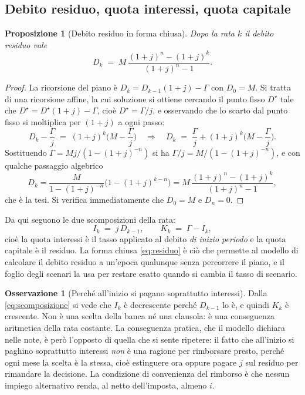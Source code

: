 \documentclass[11pt,a4paper]{article}
\theoremstyle{definition}
\newtheorem{osservazione}[definizione]{Osservazione}
\theoremstyle{plain}
\newtheorem{proposizione}[definizione]{Proposizione}
\begin{document}
\subsection{Debito residuo, quota interessi, quota capitale}

\begin{proposizione}[Debito residuo in forma chiusa]
Dopo la rata $k$ il debito residuo vale
\begin{equation}
D_k \;=\; M\,\frac{(1+j)^n - (1+j)^k}{(1+j)^n - 1} .
\label{eq:residuo}
\end{equation}
\end{proposizione}

\begin{proof}
La ricorsione del piano è $D_k = D_{k-1}(1+j) - \Gamma$ con $D_0 = M$. Si tratta di una ricorsione affine, la cui soluzione si ottiene cercando il punto fisso $D^\star$ tale che $D^\star = D^\star(1+j)-\Gamma$, cioè $D^\star = \Gamma/j$, e osservando che lo scarto dal punto fisso si moltiplica per $(1+j)$ a ogni passo:
\[
D_k - \frac{\Gamma}{j} \;=\; (1+j)^k\Big(M - \frac{\Gamma}{j}\Big)
\quad\Longrightarrow\quad
D_k \;=\; \frac{\Gamma}{j} + (1+j)^k\Big(M-\frac{\Gamma}{j}\Big).
\]
Sostituendo $\Gamma = Mj/(1-(1+j)^{-n})$ si ha $\Gamma/j = M/(1-(1+j)^{-n})$, e con qualche passaggio algebrico
\[
D_k = \frac{M}{1-(1+j)^{-n}}\Big(1-(1+j)^{k-n}\Big)
= M\,\frac{(1+j)^n-(1+j)^k}{(1+j)^n-1},
\]
che è la tesi. Si verifica immediatamente che $D_0 = M$ e $D_n = 0$.
\end{proof}

Da qui seguono le due scomposizioni della rata:
\begin{equation}
I_k \;=\; j\,D_{k-1}, \qquad K_k \;=\; \Gamma - I_k,
\label{eq:scomposizione}
\end{equation}
cioè la quota interessi è il tasso applicato al debito \emph{di inizio periodo} e la quota capitale è il residuo. La forma chiusa \eqref{eq:residuo} è ciò che permette al modello di calcolare il debito residuo a un'epoca qualunque senza percorrere il piano, e il foglio degli scenari la usa per restare esatto quando si cambia il tasso di scenario.

\begin{osservazione}[Perché all'inizio si pagano soprattutto interessi]
Dalla \eqref{eq:scomposizione} si vede che $I_k$ è decrescente perché $D_{k-1}$ lo è, e quindi $K_k$ è crescente. Non è una scelta della banca né una clausola: è una conseguenza aritmetica della rata costante. La conseguenza pratica, che il modello dichiara nelle note, è però l'opposto di quella che si sente ripetere: il fatto che all'inizio si paghino soprattutto interessi \emph{non} è una ragione per rimborsare presto, perché ogni mese la scelta è la stessa, cioè estinguere ora oppure pagare $j$ sul residuo per rimandare la decisione. La condizione di convenienza del rimborso è che nessun impiego alternativo renda, al netto dell'imposta, almeno $i$.
\end{osservazione}
\end{document}
